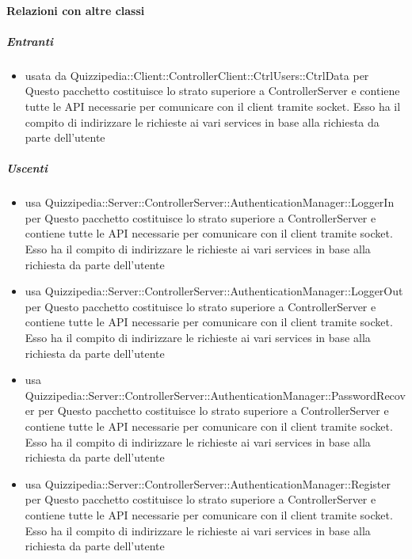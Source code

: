 \paragraph{Relazioni con altre classi}
\subparagraph{Entranti}
\begin{itemize}
\item usata da Quizzipedia::Client::ControllerClient::CtrlUsers::CtrlData per Questo pacchetto costituisce lo strato superiore a ControllerServer e contiene tutte le API necessarie per comunicare con il client tramite socket. Esso ha il compito di indirizzare le richieste ai vari services in base alla richiesta da parte dell'utente
\end{itemize}
\subparagraph{Uscenti}
\begin{itemize}
\item usa Quizzipedia::Server::ControllerServer::AuthenticationManager::LoggerIn per Questo pacchetto costituisce lo strato superiore a ControllerServer e contiene tutte le API necessarie per comunicare con il client tramite socket. Esso ha il compito di indirizzare le richieste ai vari services in base alla richiesta da parte dell'utente
\item usa Quizzipedia::Server::ControllerServer::AuthenticationManager::LoggerOut per Questo pacchetto costituisce lo strato superiore a ControllerServer e contiene tutte le API necessarie per comunicare con il client tramite socket. Esso ha il compito di indirizzare le richieste ai vari services in base alla richiesta da parte dell'utente
\item usa Quizzipedia::Server::ControllerServer::AuthenticationManager::PasswordRecover per Questo pacchetto costituisce lo strato superiore a ControllerServer e contiene tutte le API necessarie per comunicare con il client tramite socket. Esso ha il compito di indirizzare le richieste ai vari services in base alla richiesta da parte dell'utente
\item usa Quizzipedia::Server::ControllerServer::AuthenticationManager::Register per Questo pacchetto costituisce lo strato superiore a ControllerServer e contiene tutte le API necessarie per comunicare con il client tramite socket. Esso ha il compito di indirizzare le richieste ai vari services in base alla richiesta da parte dell'utente
\end{itemize}
